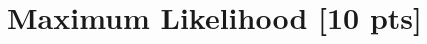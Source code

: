 \documentclass[11pt]{article}
\renewcommand{\vec}[1]{\mathbf{#1}}
\begin{document}


 


\pagebreak
\section{Maximum Likelihood [10 pts]} 
\end{document}
